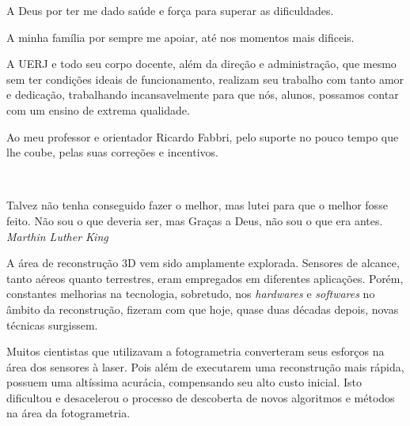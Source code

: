 \documentclass[a4paper,12pt,oneside,onecolumn,final,fleqn]{repUERJ}
\theoremstyle{plain}
\theoremstyle{definition}
\begin{document}


A Deus por ter me dado saúde e força para superar as dificuldades.


A minha família por sempre me apoiar, até nos momentos mais dificeis.


A UERJ e todo seu corpo docente, além da direção e administração, que mesmo sem ter condições ideais de funcionamento, realizam seu trabalho com tanto amor e dedicação, trabalhando incansavelmente para que nós, alunos, possamos contar com um ensino de extrema qualidade.


Ao meu professor e orientador Ricardo Fabbri, pelo suporte no pouco tempo que lhe coube, pelas suas correções e incentivos.


\pretextualchapter{}

  \vfill\
  \begin{flushright}
 Talvez não tenha conseguido fazer o melhor, mas lutei para que o melhor fosse feito. Não sou o que deveria ser, mas Graças a Deus, não sou o que era antes. \\
    \textsl{Marthin Luther King}
  \end{flushright}




A área de reconstrução 3D vem sido amplamente explorada. Sensores de alcance, tanto aéreos quanto terrestres, eram empregados em diferentes aplicações. Porém, constantes melhorias na tecnologia, sobretudo, nos \emph{hardwares} e \emph{softwares} no âmbito da reconstrução, fizeram com que hoje, quase duas décadas depois, novas técnicas surgissem.

Muitos cientistas que utilizavam a fotogrametria converteram seus esforços na área dos sensores à laser. Pois além de executarem uma reconstrução mais rápida, possuem uma altíssima acurácia, compensando seu alto custo inicial. Isto dificultou e desacelerou o processo de descoberta de novos algoritmos e métodos na área da fotogrametria. 
\end{document}
